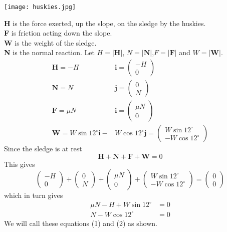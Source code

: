 \documentclass[a4paper,12pt]{article}
\numberwithin{equation}{section}
\begin{document}
\begin{question}
\qpart
\qsubpart
\begin{center}
\texttt{[image: huskies.jpg]}
\end{center}
\textbf{H} is the force exerted, up the slope, on the sledge by the huskies.\\
\textbf{F} is friction acting down the slope.\\
\textbf{W} is the weight of the sledge.\\
\textbf{N} is the normal reaction.
\qsubpart
Let $H = |\textbf{H}|$, $N =|\textbf{N}|$,$F = |\textbf{F}|$ and $W =|\textbf{W}|$.
\begin{align*}
\textbf{H}=-H&\textbf{i}=
\begin{pmatrix}
-H\\
0
\end{pmatrix}\\
\textbf{N}=N&\textbf{j}=
\begin{pmatrix}
0\\
N
\end{pmatrix}\\
\textbf{F}=\mu{N}&\textbf{i}=
\begin{pmatrix}
\mu{N}\\
0
\end{pmatrix}\\
\textbf{W}=W\sin{12^{\circ}}\textbf{i}-&W\cos{12^{\circ}}\textbf{j}=
\begin{pmatrix}
W\sin{12^{\circ}}\\
-W\cos{12^{\circ}}
\end{pmatrix}
\end{align*}
Since the sledge is at rest
\[\textbf{H}+\textbf{N}+\textbf{F}+\textbf{W}=0\]
This gives
\[\begin{pmatrix}
-H\\
0
\end{pmatrix}
+
\begin{pmatrix}
0\\
N
\end{pmatrix}
+
\begin{pmatrix}
\mu{N}\\
0
\end{pmatrix}
+
\begin{pmatrix}
W\sin{12^\circ}\\
-W\cos{12^\circ}
\end{pmatrix}
=
\begin{pmatrix}
0\\
0
\end{pmatrix}
\]
which in turn gives
\begin{align}
\mu{N}-H+W\sin{12^\circ}&=0\\
N-W\cos{12^\circ}&=0
\end{align}
We will call these equations (1) and (2) as shown.


\end{question}
\end{document}
